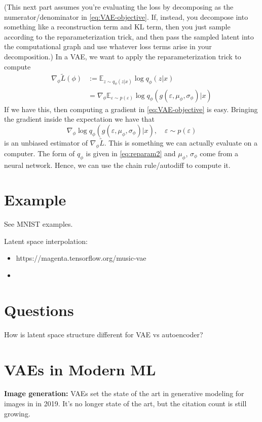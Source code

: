 \documentclass{article}
\newcommand{\E}{\mathbb{E}}
\newcommand{\grad}{\nabla}
\newcommand{\eps}{\varepsilon}
\begin{document}
(This next part assumes you're evaluating the loss by decomposing as the numerator/denominator in \eqref{eq:VAE-objective}. If, instead, you decompose into something like a reconstruction term and KL term, then you just sample according to the reparameterization trick, and then pass the sampled latent into the computational graph and use whatever loss terms arise in your decomposition.) In a VAE, we want to apply the reparameterization trick to compute
\begin{align}
    \grad_\phi \tilde L(\phi) & := \E_{z\sim q_\phi(z|x)} \log q_\phi(z|x)\\
    & = \grad_\phi \E_{\eps \sim p(\eps)} \log q_\phi(g(\eps, \mu_\phi, \sigma_\phi)|x)
\end{align}
If we have this, then computing a gradient in \eqref{eq:VAE-objective} is easy. 
Bringing the gradient inside the expectation we have that
$$
\grad_\phi \log q_\phi(g(\eps, \mu_\phi, \sigma_\phi)|x), \quad \eps \sim p(\eps)
$$
is an unbiased estimator of $\nabla_\phi \tilde L$. This is something we can actually evaluate on a computer. The form of $q_\phi$ is given in \eqref{eq:reparam2} and $\mu_\phi$, $\sigma_\phi$ come from a neural network. Hence, we can use the chain rule/autodiff to compute it.  


\section{Example}
See MNIST examples. 


\vspace{1em}
\noindent 
Latent space interpolation: 
\begin{itemize}
    \item \cite{roberts2018hierarchical} https://magenta.tensorflow.org/music-vae
    \item \cite{berthelot2018understanding} 
\end{itemize} 

\section{Questions}
How is latent space structure different for VAE vs autoencoder? 

\section{VAEs in Modern ML}

\noindent \textbf{Image generation:} 
VAEs set the state of the art in generative modeling for images in \cite{razavi2019generating} in 2019. It's no longer state of the art, but the citation count is still growing. 
\end{document}
